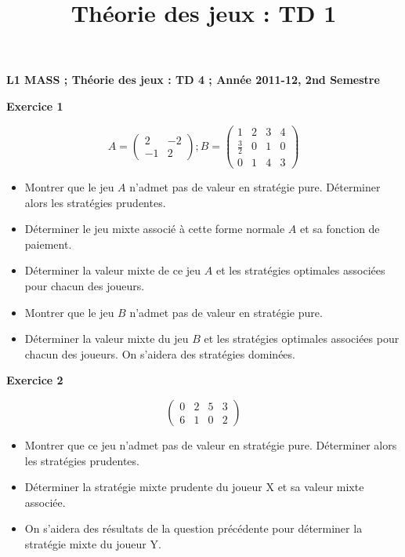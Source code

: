 \documentclass[12pt]{article}
\title{Th\'eorie des jeux : TD 1}
\date{}
\begin{document}
\pagestyle{empty}

\textbf{L1 MASS ;   Th\'eorie des jeux : TD 4    ;      Ann\'ee 2011-12, 2nd Semestre}
\medskip
\medskip
\medskip

\begin{center}
\textbf{Exercice 1}
\end{center}


\begin{equation*}
A=\begin{pmatrix}
2&-2\\
-1&2
\end{pmatrix};
B=\begin{pmatrix}
1&2&3&4\\
\frac{3}{2}&0&1&0\\
0&1&4&3
\end{pmatrix}
\end{equation*}
\begin{itemize}
\item Montrer que le jeu $A$ n'admet pas de valeur en strat\'egie pure. D\'eterminer alors les strat\'egies prudentes.
\item D\'eterminer le jeu mixte associ\'e \`a cette forme normale $A$ et sa fonction de paiement.
\item D\'eterminer la valeur mixte de ce jeu $A$ et les strat\'egies optimales associ\'ees pour chacun des joueurs.
\item Montrer que le jeu $B$ n'admet pas de valeur en strat\'egie pure.
\item D\'eterminer la valeur mixte du jeu $B$ et les strat\'egies optimales associ\'ees pour chacun des joueurs. On s'aidera des strat\'egies domin\'ees.
\end{itemize}

\begin{center}
\textbf{Exercice 2}
\end{center}


\begin{equation*}
\begin{pmatrix}
0&2&5&3\\
6&1&0&2
\end{pmatrix}
\end{equation*}
\begin{itemize}
\item Montrer que ce jeu n'admet pas de valeur en strat\'egie pure. D\'eterminer alors les strat\'egies prudentes.
\item D\'eterminer la strat\'egie mixte prudente du joueur X et sa valeur mixte associ\'ee.
\item On s'aidera des r\'esultats de la question pr\'ec\'edente pour d\'eterminer la strat\'egie mixte du joueur Y.
\end{itemize}
\end{document}
